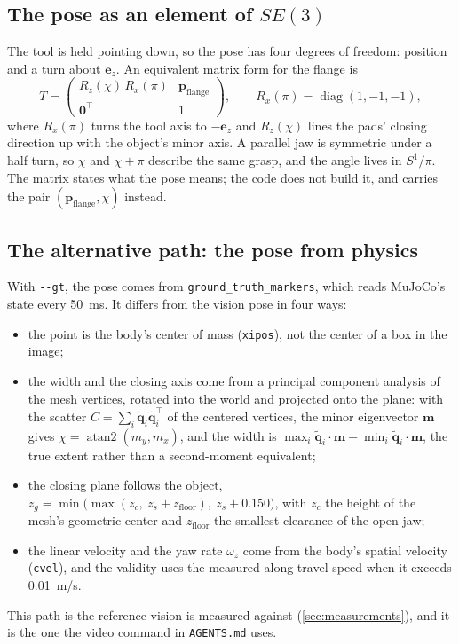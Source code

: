 \documentclass[11pt,a4paper]{article}
\theoremstyle{definition}
\theoremstyle{remark}
\newcommand{\ez}{\mathbf{e}_z}
\newcommand{\code}[1]{\texttt{#1}}
\DeclareMathOperator{\atantwo}{atan2}
\begin{document}
\subsection{The pose as an element of \texorpdfstring{$SE(3)$}{SE(3)}}

The tool is held pointing down, so the pose has four degrees of freedom:
position and a turn about $\ez$. An equivalent matrix form for the flange is
\begin{equation}
T = \begin{pmatrix} R_z(\chi)\,R_x(\pi) & \mathbf{p}_{\text{flange}} \\ \mathbf{0}^\top & 1\end{pmatrix},
\qquad R_x(\pi) = \operatorname{diag}(1,-1,-1),
\end{equation}
where $R_x(\pi)$ turns the tool axis to $-\ez$ and $R_z(\chi)$ lines the pads'
closing direction up with the object's minor axis. A parallel jaw is symmetric
under a half turn, so $\chi$ and $\chi+\pi$ describe the same grasp, and the angle
lives in $S^1/\pi$. The matrix states what the pose means; the code does not
build it, and carries the pair $(\mathbf p_{\text{flange}}, \chi)$ instead.

\subsection{The alternative path: the pose from physics}
\label{sec:pose-gt}

With \code{-{}-gt}, the pose comes from \code{ground\_truth\_markers}, which reads
MuJoCo's state every 50~ms. It differs from the vision pose in four ways:
\begin{itemize}[leftmargin=*]
\item the point is the body's center of mass (\code{xipos}), not the center of a
  box in the image;
\item the width and the closing axis come from a principal component analysis of
  the mesh vertices, rotated into the world and projected onto the plane: with
  the scatter $C = \sum_i \tilde{\mathbf q}_i\tilde{\mathbf q}_i^\top$ of the
  centered vertices, the minor eigenvector $\mathbf m$ gives
  $\chi = \atantwo(m_y, m_x)$, and the width is
  $\max_i \tilde{\mathbf q}_i\!\cdot\!\mathbf m - \min_i
  \tilde{\mathbf q}_i\!\cdot\!\mathbf m$, the true extent rather than a
  second-moment equivalent;
\item the closing plane follows the object,
  $z_g = \min\bigl(\max(z_c,\ z_s + z_{\text{floor}}),\ z_s + 0.150\bigr)$, with
  $z_c$ the height of the mesh's geometric center and $z_{\text{floor}}$ the
  smallest clearance of the open jaw;
\item the linear velocity and the yaw rate $\omega_z$ come from the body's
  spatial velocity (\code{cvel}), and the validity uses the measured
  along-travel speed when it exceeds 0.01~m/s.
\end{itemize}
This path is the reference vision is measured against
(\cref{sec:measurements}), and it is the one the video command in
\code{AGENTS.md} uses.
\end{document}
